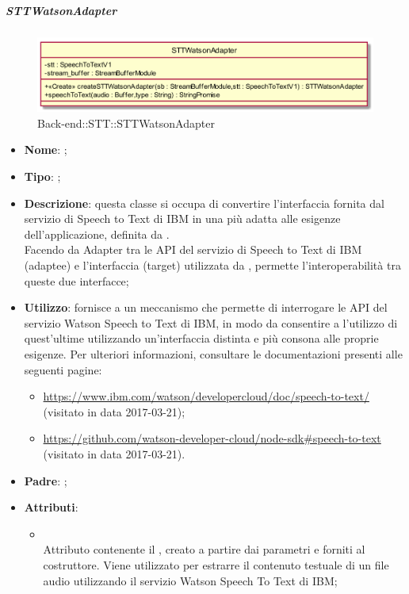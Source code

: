\hypertarget{STTWatsonAdapter_label}{\subparagraph{STTWatsonAdapter}}
\begin{figure}[h]
	\centering
	\includegraphics[width=\textwidth,height=\textheight,keepaspectratio]{images/ClassSTTWatsonAdapter.png}
	\caption{Back-end::STT::STTWatsonAdapter}
\end{figure}
\begin{itemize}
	\item \textbf{Nome}: ;
	\item \textbf{Tipo}: ;
	\item \textbf{Descrizione}: questa classe si occupa di convertire l'interfaccia fornita dal servizio di Speech to Text di IBM in una più adatta alle esigenze dell'applicazione, definita da . \\
Facendo da Adapter tra le API del servizio di Speech to Text di IBM (adaptee) e l'interfaccia  (target) utilizzata da , permette l'interoperabilità tra queste due interfacce;
	\item \textbf{Utilizzo}: fornisce a  un meccanismo che permette di interrogare le API del servizio Watson Speech to Text di IBM, in modo da consentire a  l'utilizzo di quest'ultime utilizzando un'interfaccia distinta e più consona alle proprie esigenze.
Per ulteriori informazioni, consultare le documentazioni presenti alle seguenti pagine:
\begin{itemize}
    \item \url{https://www.ibm.com/watson/developercloud/doc/speech-to-text/}  (visitato in data 2017-03-21);
    \item \url{https://github.com/watson-developer-cloud/node-sdk#speech-to-text}  (visitato in data 2017-03-21).
\end{itemize}
	\item \textbf{Padre}: ;
	\item \textbf{Attributi}:
	\begin{itemize}
		\item[]  \\
		Attributo contenente il , creato a partire dai parametri  e  forniti al costruttore. Viene utilizzato per estrarre il contenuto testuale di un file audio utilizzando il servizio Watson Speech To Text di IBM;

\end{itemize}
\end{itemize}
